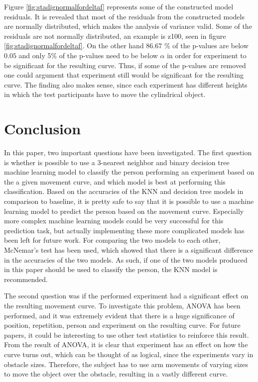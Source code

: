 \documentclass[11pt, fleqn, titlepage]{article}
\begin{document}
 Figure \ref{fig:stadignormalfordeltaf} represents some of the constructed model residuals. It is revealed that most of the residuals from the constructed models are normally distributed, which makes the analysis of variance valid. Some of the residuals are not normally distributed, an example is z100, seen in figure \ref{fig:stadignormalfordeltaf}. On the other hand $ 86.67 $ \% of the p-values are below $ 0.05 $ and only 5\% of the p-values need to be below $ \alpha $ in order for experiment to be significant for the resulting curve. Thus, if some of the p-values are removed one could argument that experiment still would be significant for the resulting curve. The finding also makes sense, since each experiment has different heights in which the test participants have to move the cylindrical object. 


\section{Conclusion}

In this paper, two important questions have been investigated. The first question is whether is possible to use a 3-nearest neighbor and binary decision tree machine learning model to classify the person performing an experiment based on the a given movement curve, and which model is best at performing this classification. Based on the accuracies of the KNN and decision tree models in comparison to baseline, it is pretty safe to say that it is possible to use a machine learning model to predict the person based on the movement curve. Especially more complex machine learning models could be very successful for this prediction task, but actually implementing these more complicated models has been left for future work. For comparing the two models to each other, McNemar's test has been used, which showed that there is a significant difference in the accuracies of the two models. As such, if one of the two models produced in this paper should be used to classify the person, the KNN model is recommended.

The second question was if the performed experiment had a significant effect on the resulting movement curve. To investigate this problem, ANOVA has been performed, and it was extremely evident that there is a huge significance of position, repetition, person and experiment on the resulting curve. For future papers, it could be interesting to use other test statistics to reinforce this result. From the result of ANOVA, it is clear that experiment has an effect on how the curve turns out, which can be thought of as logical, since the experiments vary in obstacle sizes. Therefore, the subject has to use arm movements of varying sizes to move the object over the obstacle, resulting in a vastly different curve.
\newpage


\end{document}

